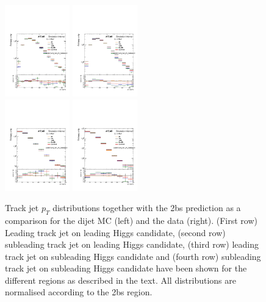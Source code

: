\begin{figure}[htbp!]
\begin{center}
\includegraphics[width=0.25\textwidth,angle=-90]{figures/boosted/AppendixDijetMC/sublHCand_trk0_Pt_Sidebandlessbin_log.pdf}
\includegraphics[width=0.25\textwidth,angle=-90]{figures/boosted/AppendixDijetMC/sublHCand_trk0_Pt_Sidebanddata_log.pdf}\\
\includegraphics[width=0.25\textwidth,angle=-90]{figures/boosted/AppendixDijetMC/sublHCand_trk1_Pt_Sidebandlessbin_log.pdf}
\includegraphics[width=0.25\textwidth,angle=-90]{figures/boosted/AppendixDijetMC/sublHCand_trk1_Pt_Sidebanddata_log.pdf}

 \caption{Track jet $p_{T}$ distributions together with the 2bs prediction as a comparison for the dijet MC (left) and the data (right). (First row) Leading track jet on leading Higgs candidate, (second row) subleading track jet on leading Higgs candidate, (third row) leading track jet on subleading Higgs candidate and (fourth row) subleading track jet on subleading Higgs candidate have been shown for the different regions as described in the text. All distributions are normalised according to the 2bs region.}

\label{fig:TjPred}
\end{center}
\end{figure}

